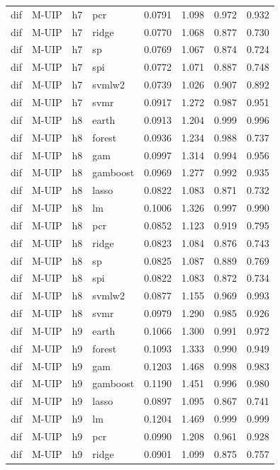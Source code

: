 \begin{ThreePartTable}
\begin{longtable}[t]{llclcccc}
dif & M-UIP & h7 & pcr & 0.0791 & 1.098 & 0.972 & 0.932\\
dif & M-UIP & h7 & ridge & 0.0770 & 1.068 & 0.877 & 0.730\\
dif & M-UIP & h7 & sp & 0.0769 & 1.067 & 0.874 & 0.724\\
dif & M-UIP & h7 & spi & 0.0772 & 1.071 & 0.887 & 0.748\\
dif & M-UIP & h7 & svmlw2 & 0.0739 & 1.026 & 0.907 & 0.892\\
dif & M-UIP & h7 & svmr & 0.0917 & 1.272 & 0.987 & 0.951\\
\addlinespace
dif & M-UIP & h8 & earth & 0.0913 & 1.204 & 0.999 & 0.996\\
dif & M-UIP & h8 & forest & 0.0936 & 1.234 & 0.988 & 0.737\\
dif & M-UIP & h8 & gam & 0.0997 & 1.314 & 0.994 & 0.956\\
dif & M-UIP & h8 & gamboost & 0.0969 & 1.277 & 0.992 & 0.935\\
dif & M-UIP & h8 & lasso & 0.0822 & 1.083 & 0.871 & 0.732\\
dif & M-UIP & h8 & lm & 0.1006 & 1.326 & 0.997 & 0.990\\
dif & M-UIP & h8 & pcr & 0.0852 & 1.123 & 0.919 & 0.795\\
dif & M-UIP & h8 & ridge & 0.0823 & 1.084 & 0.876 & 0.743\\
dif & M-UIP & h8 & sp & 0.0825 & 1.087 & 0.889 & 0.769\\
dif & M-UIP & h8 & spi & 0.0822 & 1.083 & 0.872 & 0.734\\
dif & M-UIP & h8 & svmlw2 & 0.0877 & 1.155 & 0.969 & 0.993\\
dif & M-UIP & h8 & svmr & 0.0979 & 1.290 & 0.985 & 0.926\\
\addlinespace
dif & M-UIP & h9 & earth & 0.1066 & 1.300 & 0.991 & 0.972\\
dif & M-UIP & h9 & forest & 0.1093 & 1.333 & 0.990 & 0.949\\
dif & M-UIP & h9 & gam & 0.1203 & 1.468 & 0.998 & 0.983\\
dif & M-UIP & h9 & gamboost & 0.1190 & 1.451 & 0.996 & 0.980\\
dif & M-UIP & h9 & lasso & 0.0897 & 1.095 & 0.867 & 0.741\\
dif & M-UIP & h9 & lm & 0.1204 & 1.469 & 0.999 & 0.999\\
dif & M-UIP & h9 & pcr & 0.0990 & 1.208 & 0.961 & 0.928\\
dif & M-UIP & h9 & ridge & 0.0901 & 1.099 & 0.875 & 0.757\\

\end{longtable}
\end{ThreePartTable}
